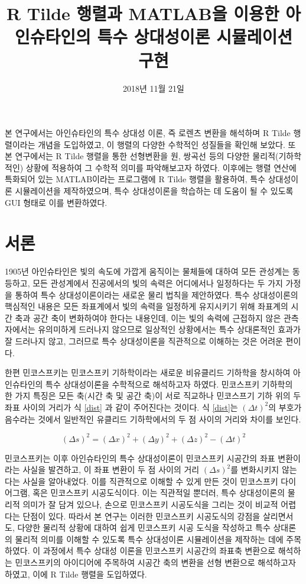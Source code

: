 \documentclass{thesis-SJ}
\title[Simulating Einstein’s Special Relativity Using R Tilde Matrix and MATLAB]{R Tilde 행렬과 MATLAB을 이용한 아인슈타인의 특수 상대성이론 시뮬레이션 구현}
\date{2018년 11월 21일}{November 21st, 2018}
\begin{document}
\KoreanAbstract

본 연구에서는 아인슈타인의 특수 상대성 이론, 즉 로렌츠 변환을 해석하며 R Tilde 행렬이라는 개념을 도입하였고, 이 행렬의 다양한 수학적인 성질들을 확인해 보았다. 또 본 연구에서는 R Tilde 행렬을 통한 선형변환을 원, 쌍곡선 등의 다양한 물리적(기하학적인) 상황에 적용하여 그 수학적 의미를 파악해보고자 하였다. 이후에는 행렬 연산에 특화되어 있는 MATLAB이라는 프로그램에 R Tilde 행렬을 활용하여, 특수 상대성이론 시뮬레이션을 제작하였으며, 특수 상대성이론을 학습하는 데 도움이 될 수 있도록 GUI 형태로 이를 변환하였다.


\tableofcontents
 
\mainpartstart

\chapter{서론} 

1905년 아인슈타인은 빛의 속도에 가깝게 움직이는 물체들에 대하여 모든 관성계는 동등하고, 모든 관성계에서 진공에서의 빛의 속력은 어디에서나 일정하다는 두 가지 가정을 통하여 특수 상대성이론이라는 새로운 물리 법칙을 제안하였다. 특수 상대성이론의 핵심적인 내용은 모든 좌표계에서 빛의 속력을 일정하게 유지시키기 위해 좌표계의 시간 축과 공간 축이 변화하여야 한다는 내용인데, 이는 빛의 속력에 근접하지 않은 관측자에서는 유의미하게 드러나지 않으므로 일상적인 상황에서는 특수 상대론적인 효과가 잘 드러나지 않고, 그러므로 특수 상대성이론을 직관적으로 이해하는 것은 어려운 편이다. 

한편 민코스프키는 민코스프키 기하학이라는 새로운 비유클리드 기하학을 창시하여 아인슈타인의 특수 상대성이론을 수학적으로 해석하고자 하였다. 민코스프키 기하학의 한 가지 특징은 모든 축(시간 축 및 공간 축)이 서로 직교하나 민코스프기 기하 위의 두 좌표 사이의 거리가 식 \eqref{dist} 과 같이 주어진다는 것이다. 식 \eqref{dist}는 $(\Delta t)^2$의 부호가 음수라는 것에서 일반적인 유클리드 기하학에서의 두 점 사이의 거리와 차이를 보인다.

\begin{equation}
	(\Delta s)^2 = (\Delta x)^2 + (\Delta y)^2 + (\Delta z)^2 - (\Delta t)^2 \label{dist}
\end{equation}

민코스프키는 이후 아인슈타인의 특수 상대성이론이 민코스프키 시공간의 좌표 변환이라는 사실을 발견하고, 이 좌표 변환이 두 점 사이의 거리 $(\Delta s)^2$를 변화시키지 않는다는 사실을 알아내었다. 이를 직관적으로 이해할 수 있게 만든 것이 민코스프키 다이어그램, 혹은 민코스프키 시공도식이다. 이는 직관적일 뿐더러, 특수 상대성이론의 물리적 의미가 잘 담겨 있으나, 손으로 민코스프키 시공도식을 그리는 것이 비교적 어렵다는 단점이 있다. 따라서 본 연구는 이러한 민코스프키 시공도식의 강점을 살리면서도, 다양한 물리적 상황에 대하여 쉽게 민코스프키 시공 도식을 작성하고 특수 상대론의 물리적 의미를 이해할 수 있도록 특수 상대성이론 시뮬레이션을 제작하는 데에 주목하였다. 이 과정에서 특수 상대성 이론을 민코스프키 시공간의 좌표축 변환으로 해석하는 민코스프키의 아이디어에 주목하여 시공간 축의 변환을 선형 변환으로 해석하고자 하였고, 이에 R Tilde 행렬을 도입하였다.
\end{document}
